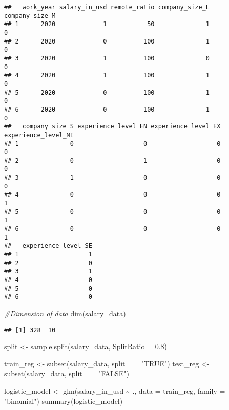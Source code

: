 \documentclass[
]{article}
\newenvironment{Shaded}{\begin{snugshade}}{\end{snugshade}}
\newcommand{\AttributeTok}[1]{\textcolor[rgb]{0.77,0.63,0.00}{#1}}
\newcommand{\CommentTok}[1]{\textcolor[rgb]{0.56,0.35,0.01}{\textit{#1}}}
\newcommand{\FloatTok}[1]{\textcolor[rgb]{0.00,0.00,0.81}{#1}}
\newcommand{\FunctionTok}[1]{\textcolor[rgb]{0.00,0.00,0.00}{#1}}
\newcommand{\NormalTok}[1]{#1}
\newcommand{\OtherTok}[1]{\textcolor[rgb]{0.56,0.35,0.01}{#1}}
\newcommand{\SpecialCharTok}[1]{\textcolor[rgb]{0.00,0.00,0.00}{#1}}
\newcommand{\StringTok}[1]{\textcolor[rgb]{0.31,0.60,0.02}{#1}}
\begin{document}
\begin{verbatim}
##   work_year salary_in_usd remote_ratio company_size_L company_size_M
## 1      2020             1           50              1              0
## 2      2020             0          100              1              0
## 3      2020             1          100              0              0
## 4      2020             1          100              1              0
## 5      2020             0          100              1              0
## 6      2020             0          100              1              0
##   company_size_S experience_level_EN experience_level_EX experience_level_MI
## 1              0                   0                   0                   0
## 2              0                   1                   0                   0
## 3              1                   0                   0                   0
## 4              0                   0                   0                   1
## 5              0                   0                   0                   1
## 6              0                   0                   0                   1
##   experience_level_SE
## 1                   1
## 2                   0
## 3                   1
## 4                   0
## 5                   0
## 6                   0
\end{verbatim}

\begin{Shaded}
\begin{Highlighting}[]
\CommentTok{\#Dimension of data}
\FunctionTok{dim}\NormalTok{(salary\_data)}
\end{Highlighting}
\end{Shaded}

\begin{verbatim}
## [1] 328  10
\end{verbatim}

\begin{Shaded}
\begin{Highlighting}[]
\NormalTok{split }\OtherTok{\textless{}{-}} \FunctionTok{sample.split}\NormalTok{(salary\_data, }\AttributeTok{SplitRatio =} \FloatTok{0.8}\NormalTok{)}
   
\NormalTok{train\_reg }\OtherTok{\textless{}{-}} \FunctionTok{subset}\NormalTok{(salary\_data, split }\SpecialCharTok{==} \StringTok{"TRUE"}\NormalTok{)}
\NormalTok{test\_reg }\OtherTok{\textless{}{-}} \FunctionTok{subset}\NormalTok{(salary\_data, split }\SpecialCharTok{==} \StringTok{"FALSE"}\NormalTok{)}

\NormalTok{logistic\_model }\OtherTok{\textless{}{-}} \FunctionTok{glm}\NormalTok{(salary\_in\_usd }\SpecialCharTok{\textasciitilde{}}\NormalTok{ ., }
                      \AttributeTok{data =}\NormalTok{ train\_reg, }
                      \AttributeTok{family =} \StringTok{"binomial"}\NormalTok{)}
\FunctionTok{summary}\NormalTok{(logistic\_model)}
\end{Highlighting}
\end{Shaded}
\end{document}
